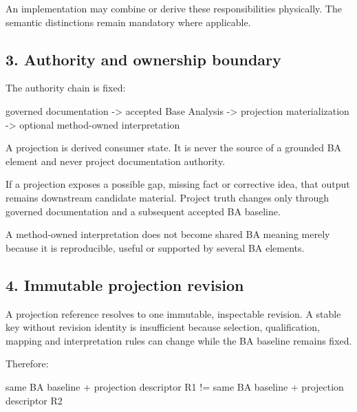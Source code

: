 \documentclass[
  11pt,
  a4paper,
]{article}
\newenvironment{Shaded}{}{}
\newcommand{\NormalTok}[1]{#1}
\begin{document}
An implementation may combine or derive these responsibilities
physically. The semantic distinctions remain mandatory where applicable.

\subsection{3. Authority and ownership
boundary}\label{authority-and-ownership-boundary}

The authority chain is fixed:

\begin{Shaded}
\begin{Highlighting}[]
\NormalTok{governed documentation}
\NormalTok{    {-}\textgreater{} accepted Base Analysis}
\NormalTok{        {-}\textgreater{} projection materialization}
\NormalTok{            {-}\textgreater{} optional method{-}owned interpretation}
\end{Highlighting}
\end{Shaded}

A projection is derived consumer state. It is never the source of a
grounded BA element and never project documentation authority.

If a projection exposes a possible gap, missing fact or corrective idea,
that output remains downstream candidate material. Project truth changes
only through governed documentation and a subsequent accepted BA
baseline.

A method-owned interpretation does not become shared BA meaning merely
because it is reproducible, useful or supported by several BA elements.

\subsection{4. Immutable projection
revision}\label{immutable-projection-revision}

A projection reference resolves to one immutable, inspectable revision.
A stable key without revision identity is insufficient because
selection, qualification, mapping and interpretation rules can change
while the BA baseline remains fixed.

Therefore:

\begin{Shaded}
\begin{Highlighting}[]
\NormalTok{same BA baseline}
\NormalTok{+ projection descriptor R1}
\NormalTok{    !=}
\NormalTok{same BA baseline}
\NormalTok{+ projection descriptor R2}
\end{Highlighting}
\end{Shaded}
\end{document}
